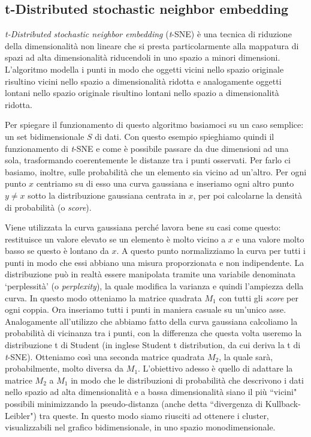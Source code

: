 \documentclass[12pt,italian]{report}
\begin{document}
\subsection{t-Distributed stochastic neighbor embedding}
\emph{t-Distributed stochastic neighbor embedding} (\emph{t}-SNE) è una tecnica di riduzione della dimensionalità non lineare che si presta particolarmente alla mappatura di spazi ad alta dimensionalità riducendoli in uno spazio a minori dimensioni. L'algoritmo modella i punti in modo che oggetti vicini nello spazio originale risultino vicini nello spazio a dimensionalità ridotta e analogamente oggetti lontani nello spazio originale risultino lontani nello spazio a dimensionalità ridotta.

Per spiegare il funzionamento di questo algoritmo basiamoci su un caso semplice: un set bidimensionale $S$ di dati. Con questo esempio spieghiamo quindi il funzionamento di \emph{t}-SNE e come è possibile passare da due dimensioni ad una sola, trasformando coerentemente le distanze tra i punti osservati. Per farlo ci basiamo, inoltre, sulle probabilità che un elemento sia vicino ad un'altro. Per ogni punto $ x $ centriamo su di esso una curva gaussiana e inseriamo ogni altro punto $ y \neq x $ 
sotto la distribuzione gaussiana centrata in $ x $, per poi calcolarne la densità di probabilità (o \emph{score}).

Viene utilizzata la curva gaussiana perché lavora bene su casi come questo: restituisce un valore elevato se un elemento è molto vicino a $x$ e una valore molto basso se questo è lontano da $x$. A questo punto normalizziamo la curva per tutti i punti in modo che essi abbiano una misura proporzionata e non indipendente. La distribuzione può in realtà essere manipolata tramite una variabile denominata `perplessità' (o \emph{perplexity}), la quale modifica la varianza e quindi l'ampiezza della curva.
In questo modo otteniamo la matrice quadrata $ M_{1} $ con tutti gli \emph{score} per ogni coppia. Ora inseriamo tutti i punti in maniera casuale su un'unico asse. Analogamente all'utilizzo che abbiamo fatto della curva gaussiana calcoliamo la probabilità di vicinanza tra i punti, con la differenza che questa volta useremo la distribuzione t di Student (in inglese Student t distribution, da cui deriva la t di \emph{t}-SNE). Otteniamo così una seconda matrice quadrata $ M_{2} $, la quale sarà, probabilmente, molto diversa da $ M_{1} $. L'obiettivo adesso è quello di adattare la matrice $ M_{2} $ a $ M_{1} $ in modo che le distribuzioni di probabilità che descrivono i dati nello spazio ad alta dimensionalità e a bassa dimensionalità siano il più ``vicini" possibili minimizzando la pseudo-distanza (anche detta ``divergenza di Kullback-Leibler") tra queste. In questo modo siamo riusciti ad ottenere i cluster, visualizzabili nel grafico bidimensionale, in uno spazio monodimensionale.
\end{document}
